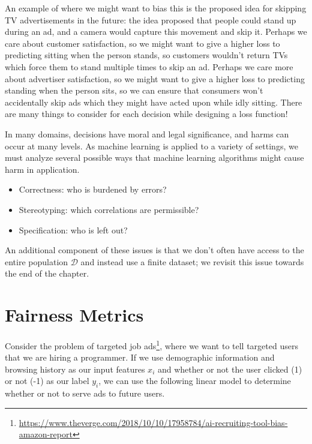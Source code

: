 An example of where we might want to bias this is the proposed idea for skipping TV advertisements in the future: the idea proposed that people could stand up during an ad, and a camera would capture this movement and skip it.  Perhaps we care about customer satisfaction, so we might want to give a higher loss to predicting sitting when the person stands, so customers wouldn't return TVs which force them to stand multiple times to skip an ad.  Perhaps we care more about advertiser satisfaction, so we might want to give a higher loss to predicting standing when the person sits, so we can ensure that consumers won't accidentally skip ads which they might have acted upon while idly sitting.  There are many things to consider for each decision while designing a loss function!

In many domains, decisions have moral and legal significance, and harms can occur at many levels.  As machine learning is applied to a variety of settings, we must analyze several possible ways that machine learning algorithms might cause harm in application.  \\

\begin{itemize}
    \item Correctness: who is burdened by errors?
    \item Stereotyping: which correlations are permissible?
    \item Specification: who is left out?
\end{itemize}

An additional component of these issues is that we don't often have access to the entire population $\mathcal D$ and instead use a finite dataset; we revisit this issue towards the end of the chapter.





\section{Fairness Metrics}

Consider the problem of targeted job ads\footnote{\url{https://www.theverge.com/2018/10/10/17958784/ai-recruiting-tool-bias-amazon-report}}, where we want to tell targeted users that we are hiring a programmer. If we use demographic information and browsing history as our input features $x_i$ and whether or not the user clicked (1) or not (-1) as our label $y_i$, we can use the following linear model to determine whether or not to serve ads to future users.

